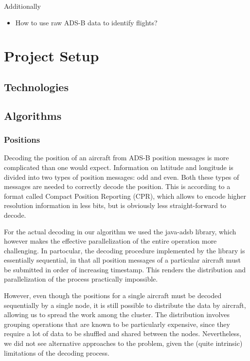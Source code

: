 \documentclass{vldb}
\begin{document}
Additionally

\begin{itemize}
  \item How to use raw ADS-B data to identify flights?
\end{itemize}

\section{Project Setup}

\subsection{Technologies}

\subsection{Algorithms}

\subsubsection{Positions}

Decoding the position of an aircraft from ADS-B position messages is more
complicated than one would expect. Information on latitude and longitude is
divided into two types of position messages: odd and even. Both these types of
messages are needed to correctly decode the position. This is according to a
format called Compact Position Reporting (CPR), which allows to encode higher
resolution information in less bits, but is obviously less straight-forward to
decode.

For the actual decoding in our algorithm we used the java-adsb library, which
however makes the effective parallelization of the entire operation more
challenging. In partocular, the decoding procedure implemented by the library is
essentially sequential, in that all position messages of a particular aircraft
must be submitted in order of increasing timestamp. This renders the
distribution and parallelization of the process practically impossible.

However, even though the positions for a single aircraft must be decoded
sequentially by a single node, it is still possible to distribute the data by
aircraft, allowing us to spread the work among the cluster. The distribution
involves grouping operations that are known to be particularly expensive, since
they require a lot of data to be shuffled and shared between the nodes.
Nevertheless, we did not see alternative approaches to the problem, given the
(quite intrinsic) limitations of the decoding process.
\end{document}

